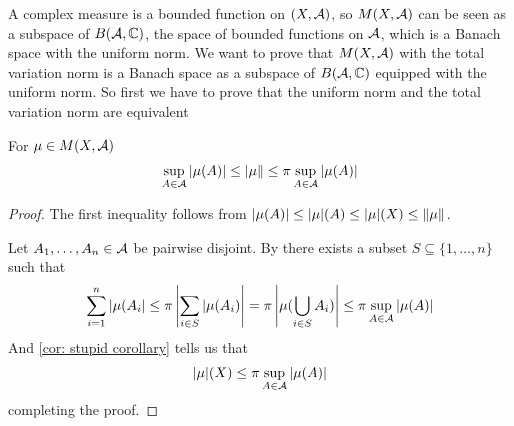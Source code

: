 \documentclass[../../main.tex]{subfiles}
\begin{document}
A complex measure is a bounded function on $(X, \mathcal{A})$, so $M(X, \mathcal{A})$ can be seen as a subspace of $B(\mathcal{A}, \mathbb{C})$, the space of bounded functions on $\mathcal{A}$, which is a Banach space with the uniform norm. We want to prove that $M(X, \mathcal{A})$ with the total variation norm is a Banach space as a subspace of $B(\mathcal{A}, \mathbb{C})$ equipped with the uniform norm. So first we have to prove that the uniform norm and the total variation norm are equivalent

\begin{lemma}
For $\mu \in M(X, \mathcal{A})$
\begin{align*}
	\sup_{A\in \mathcal{A}} |\mu(A)| \le \vert \mu \Vert \le \pi \sup_{A\in \mathcal{A}} |\mu(A)|
\end{align*}
\end{lemma}
\begin{proof}
The first inequality follows from $|\mu(A)| \le |\mu|(A)\le |\mu|(X) \le \Vert{\mu}\Vert_{}$.

Let $A_{1},\dots,A_{n}\in \mathcal{A}$ be pairwise disjoint. By  there exists a subset $S\subseteq \{1,\dots, n\}$ such that
\begin{align*}
	\sum_{i=1}^{n}|\mu(A_{i}| \le \pi \left| \sum_{i\in S}|\mu(A_{i}) \right| = \pi \left| \mu(\bigcup_{i\in S} A_{i}) \right| \le \pi \sup_{A\in \mathcal{A}} |\mu(A)|
\end{align*}
And \cref{cor: stupid corollary} tells us that
\begin{align*}
	|\mu|(X)\le \pi \sup_{A\in \mathcal{A}} |\mu(A)|
\end{align*}
completing the proof.
\end{proof}

\end{document}

